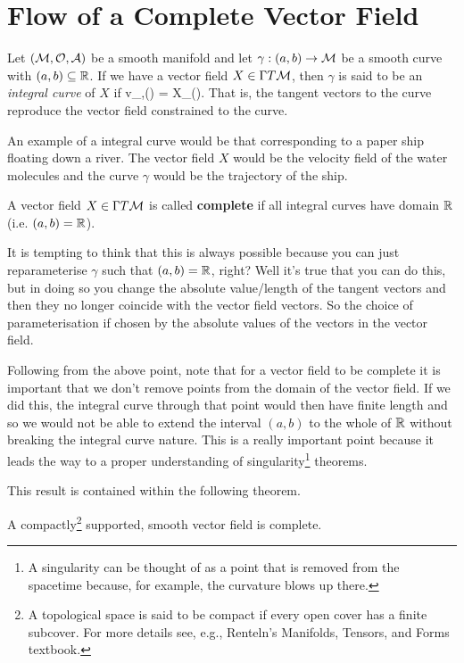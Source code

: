 \section{Flow of a Complete Vector Field}

    Let $(\mathcal{M},\mathcal{O},\mathcal{A})$ be a smooth manifold and let $\gamma:(a,b)\to \mathcal{M}$ be a smooth curve with $(a,b)\subseteq\mathbb{R}$. If we have a vector field $X\in\Gamma T\mathcal{M}$, then $\gamma$ is said to be an \textit{integral curve} of $X$ if
    \bse 
        v_{\gamma,\gamma(\lambda)} = X_{\gamma(\lambda)}.
    \ese 
    That is, the tangent vectors to the curve reproduce the vector field constrained to the curve. 
\ed 

\bex 
    An example of a integral curve would be that corresponding to a paper ship floating down a river. The vector field $X$ would be the velocity field of the water molecules and the curve $\gamma$ would be the trajectory of the ship. 
\eex 

    A vector field $X\in\Gamma T\mathcal{M}$ is called \textbf{complete} if all integral curves have domain $\mathbb{R}$ (i.e. $(a,b)=\mathbb{R}$).
\ed 

It is tempting to think that this is always possible because you can just reparameterise $\gamma$ such that $(a,b)=\mathbb{R}$, right? Well it's true that you can do this, but in doing so you change the absolute value/length of the tangent vectors and then they no longer coincide with the vector field vectors. So the choice of parameterisation if chosen by the absolute values of the vectors in the vector field. 

Following from the above point, note that for a vector field to be complete it is important that we don't remove points from the domain of the vector field. If we did this, the integral curve through that point would then have finite length and so we would not be able to extend the interval $(a,b)$ to the whole of $\mathbb{R}$ without breaking the integral curve nature. This is a really important point because it leads the way to a proper understanding of singularity\footnote{A singularity can be thought of as a point that is removed from the spacetime because, for example, the curvature blows up there.} theorems.

This result is contained within the following theorem. 

\bt 
    A compactly\footnote{A topological space is said to be compact if every open cover has a finite subcover. For more details see, e.g., Renteln's Manifolds, Tensors, and Forms textbook.} supported, smooth vector field is complete. 
\et 

